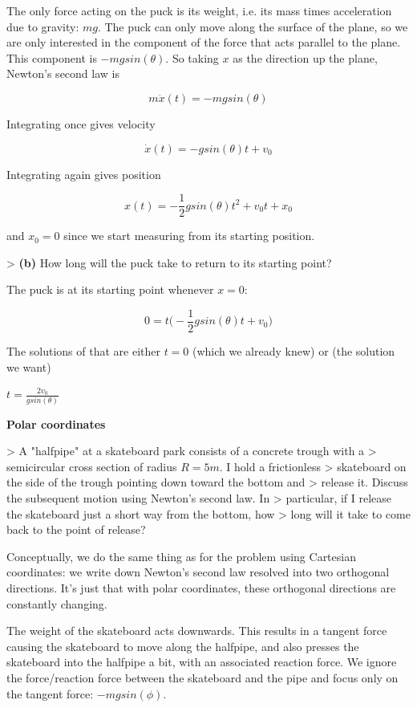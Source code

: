 The only force acting on the puck is its weight, i.e. its mass times
acceleration due to gravity: $mg$. The puck can only move along the surface of
the plane, so we are only interested in the component of the force that acts
parallel to the plane. This component is $-mg sin(\theta)$. So taking $x$ as the
direction up the plane, Newton's second law is

$$ m\ddot x(t) = -mgsin(\theta)$$

Integrating once gives velocity

$$ \dot x(t) = -g sin(\theta) t + v_0$$

Integrating again gives position

$$ x(t) = -\frac{1}{2} g sin(\theta) t^2 + v_0t + x_0$$

and $x_0=0$ since we start measuring from its starting position.

> \textbf{(b)} How long will the puck take to return to its starting point?

The puck is at its starting point whenever $x = 0$:

$$0 = t\bigg(-\frac{1}{2} g sin(\theta) t + v_0\bigg)$$

The solutions of that are either $t=0$ (which we already knew) or (the solution
we want)

$t = \frac{2v_0}{g sin(\theta)}$

\textbf{Polar coordinates}

> A "halfpipe" at a skateboard park consists of a concrete trough with a
> semicircular cross section of radius $R = 5m$. I hold a frictionless
> skateboard on the side of the trough pointing down toward the bottom and
> release it. Discuss the subsequent motion using Newton's second law. In
> particular, if I release the skateboard just a short way from the bottom, how
> long will it take to come back to the point of release?

Conceptually, we do the same thing as for the problem using Cartesian
coordinates: we write down Newton's second law resolved into two orthogonal
directions. It's just that with polar coordinates, these orthogonal directions
are constantly changing.

The weight of the skateboard acts downwards. This results in a tangent force
causing the skateboard to move along the halfpipe, and also presses the
skateboard into the halfpipe a bit, with an associated reaction force. We
ignore the force/reaction force between the skateboard and the pipe and focus
only on the tangent force: $-mg sin(\phi)$.


